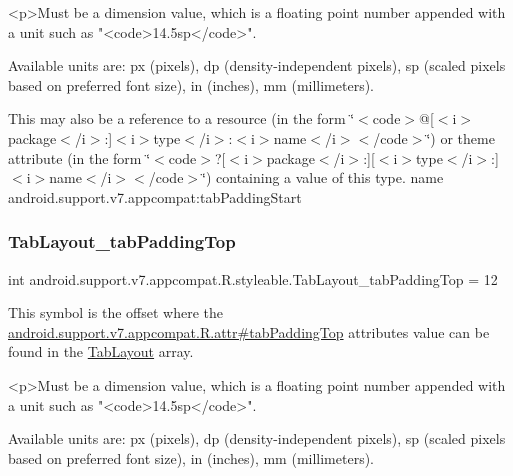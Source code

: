 \begin{DoxyVerb}      <p>Must be a dimension value, which is a floating point number appended with a unit such as "<code>14.5sp</code>".
\end{DoxyVerb}
 Available units are\+: px (pixels), dp (density-\/independent pixels), sp (scaled pixels based on preferred font size), in (inches), mm (millimeters). 

This may also be a reference to a resource (in the form \char`\"{}$<$code$>$@\mbox{[}$<$i$>$package$<$/i$>$\+:\mbox{]}$<$i$>$type$<$/i$>$\+:$<$i$>$name$<$/i$>$$<$/code$>$\char`\"{}) or theme attribute (in the form \char`\"{}$<$code$>$?\mbox{[}$<$i$>$package$<$/i$>$\+:\mbox{]}\mbox{[}$<$i$>$type$<$/i$>$\+:\mbox{]}$<$i$>$name$<$/i$>$$<$/code$>$\char`\"{}) containing a value of this type.  name android.\+support.\+v7.\+appcompat\+:tab\+Padding\+Start \mbox{\label{classandroid_1_1support_1_1v7_1_1appcompat_1_1R_1_1styleable_aba4947a78faa7f4241585dfd200d7bd1}} 
\subsubsection{\texorpdfstring{Tab\+Layout\+\_\+tab\+Padding\+Top}{TabLayout\_tabPaddingTop}}
{\footnotesize\ttfamily int android.\+support.\+v7.\+appcompat.\+R.\+styleable.\+Tab\+Layout\+\_\+tab\+Padding\+Top = 12\hspace{0.3cm}{\ttfamily [static]}}

This symbol is the offset where the \hyperlink{classandroid_1_1support_1_1v7_1_1appcompat_1_1R_1_1attr_a7095b04954f6877225cff0ea0097259a}{android.\+support.\+v7.\+appcompat.\+R.\+attr\#tab\+Padding\+Top} attribute\textquotesingle{}s value can be found in the \hyperlink{classandroid_1_1support_1_1v7_1_1appcompat_1_1R_1_1styleable_a3c85d0c4cebbccf5b1a16ecfe13938ca}{Tab\+Layout} array.

\begin{DoxyVerb}      <p>Must be a dimension value, which is a floating point number appended with a unit such as "<code>14.5sp</code>".
\end{DoxyVerb}
 Available units are\+: px (pixels), dp (density-\/independent pixels), sp (scaled pixels based on preferred font size), in (inches), mm (millimeters). 

